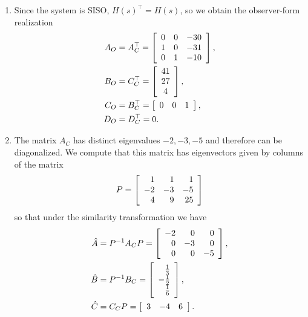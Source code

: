 \documentclass{article}
\begin{document}
\begin{enumerate}
{  }
  \item{
    Since the system is SISO, $H(s)^\top = H(s)$, so we obtain the
    observer-form realization
    \begin{align*}
    A_O &= A_C^\top =
    \left[\begin{array}{r r r}
      0 & 0 & -30 \\
      1 & 0 & -31 \\
      0 & 1 & -10
    \end{array}\right], \\
    B_O &= C_C^\top =
    \left[\begin{array}{c}
      41 \\
      27 \\
      4
    \end{array}\right], \\
    C_O &= B_C^\top =
    \left[\begin{array}{c c c}
      0 & 0 & 1
    \end{array}\right], \\
    D_O &= D_C^\top = 0.
    \end{align*}
  }
  \item{
    The matrix $A_C$ has distinct eigenvalues $-2, -3, -5$ and
    therefore can be diagonalized. We compute that this matrix has
    eigenvectors given by columns of the matrix
    $$
    P = \left[\begin{array}{r r r}
      1 &  1 &  1 \\
     -2 & -3 & -5 \\
      4 &  9 & 25
    \end{array}\right]
    $$
    so that under the similarity transformation we have
    \begin{align*}
    \hat{A} &= P^{-1} A_C P =
    \left[\begin{array}{r r r}
      -2 &  0 &  0 \\
       0 & -3 &  0 \\
       0 &  0 & -5
    \end{array}\right], \\
    \hat{B} &= P^{-1} B_C =
    \left[\begin{array}{r}
       \frac{1}{3} \\
      -\frac{1}{2} \\
       \frac{1}{6}
    \end{array}\right], \\
    \hat{C} &= C_C P =
    \left[\begin{array}{r r r}
      3 & -4 & 6
    \end{array}\right].
    \end{align*}
  }
\end{enumerate}
\end{document}
